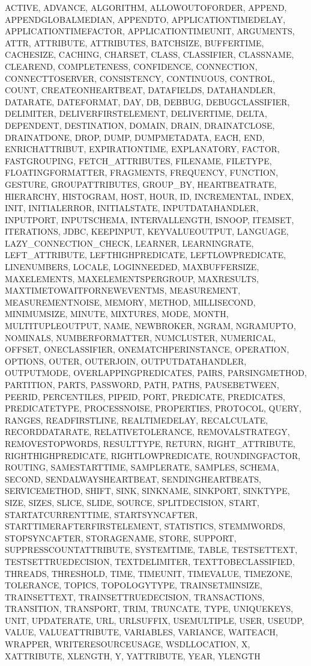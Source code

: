 {{ACTIVE, ADVANCE, ALGORITHM, ALLOWOUTOFORDER, APPEND, APPENDGLOBALMEDIAN, APPENDTO, APPLICATIONTIMEDELAY, APPLICATIONTIMEFACTOR, APPLICATIONTIMEUNIT, ARGUMENTS, ATTR, ATTRIBUTE, ATTRIBUTES, BATCHSIZE, BUFFERTIME, CACHESIZE, CACHING, CHARSET, CLASS, CLASSIFIER, CLASSNAME, CLEAREND, COMPLETENESS, CONFIDENCE, CONNECTION, CONNECTTOSERVER, CONSISTENCY, CONTINUOUS, CONTROL, COUNT, CREATEONHEARTBEAT, DATAFIELDS, DATAHANDLER, DATARATE, DATEFORMAT, DAY, DB, DEBBUG, DEBUGCLASSIFIER, DELIMITER, DELIVERFIRSTELEMENT, DELIVERTIME, DELTA, DEPENDENT, DESTINATION, DOMAIN, DRAIN, DRAINATCLOSE, DRAINATDONE, DROP, DUMP, DUMPMETADATA, EACH, END, ENRICHATTRIBUT, EXPIRATIONTIME, EXPLANATORY, FACTOR, FASTGROUPING, FETCH_ATTRIBUTES, FILENAME, FILETYPE, FLOATINGFORMATTER, FRAGMENTS, FREQUENCY, FUNCTION, GESTURE, GROUPATTRIBUTES, GROUP_BY, HEARTBEATRATE, HIERARCHY, HISTOGRAM, HOST, HOUR, ID, INCREMENTAL, INDEX, INIT, INITIALERROR, INITIALSTATE, INPUTDATAHANDLER, INPUTPORT, INPUTSCHEMA, INTERVALLENGTH, ISNOOP, ITEMSET, ITERATIONS, JDBC, KEEPINPUT, KEYVALUEOUTPUT, LANGUAGE, LAZY_CONNECTION_CHECK, LEARNER, LEARNINGRATE, LEFT_ATTRIBUTE, LEFTHIGHPREDICATE, LEFTLOWPREDICATE, LINENUMBERS, LOCALE, LOGINNEEDED, MAXBUFFERSIZE, MAXELEMENTS, MAXELEMENTSPERGROUP, MAXRESULTS, MAXTIMETOWAITFORNEWEVENTMS, MEASUREMENT, MEASUREMENTNOISE, MEMORY, METHOD, MILLISECOND, MINIMUMSIZE, MINUTE, MIXTURES, MODE, MONTH, MULTITUPLEOUTPUT, NAME, NEWBROKER, NGRAM, NGRAMUPTO, NOMINALS, NUMBERFORMATTER, NUMCLUSTER, NUMERICAL, OFFSET, ONECLASSIFIER, ONEMATCHPERINSTANCE, OPERATION, OPTIONS, OUTER, OUTERJOIN, OUTPUTDATAHANDLER, OUTPUTMODE, OVERLAPPINGPREDICATES, PAIRS, PARSINGMETHOD, PARTITION, PARTS, PASSWORD, PATH, PATHS, PAUSEBETWEEN, PEERID, PERCENTILES, PIPEID, PORT, PREDICATE, PREDICATES, PREDICATETYPE, PROCESSNOISE, PROPERTIES, PROTOCOL, QUERY, RANGES, READFIRSTLINE, REALTIMEDELAY, RECALCULATE, RECORDDATARATE, RELATIVETOLERANCE, REMOVALSTRATEGY, REMOVESTOPWORDS, RESULTTYPE, RETURN, RIGHT_ATTRIBUTE, RIGHTHIGHPREDICATE, RIGHTLOWPREDICATE, ROUNDINGFACTOR, ROUTING, SAMESTARTTIME, SAMPLERATE, SAMPLES, SCHEMA, SECOND, SENDALWAYSHEARTBEAT, SENDINGHEARTBEATS, SERVICEMETHOD, SHIFT, SINK, SINKNAME, SINKPORT, SINKTYPE, SIZE, SIZES, SLICE, SLIDE, SOURCE, SPLITDECISION, START, STARTATCURRENTTIME, STARTSYNCAFTER, STARTTIMERAFTERFIRSTELEMENT, STATISTICS, STEMMWORDS, STOPSYNCAFTER, STORAGENAME, STORE, SUPPORT, SUPPRESSCOUNTATTRIBUTE, SYSTEMTIME, TABLE, TESTSETTEXT, TESTSETTRUEDECISION, TEXTDELIMITER, TEXTTOBECLASSIFIED, THREADS, THRESHOLD, TIME, TIMEUNIT, TIMEVALUE, TIMEZONE, TOLERANCE, TOPICS, TOPOLOGYTYPE, TRAINSETMINSIZE, TRAINSETTEXT, TRAINSETTRUEDECISION, TRANSACTIONS, TRANSITION, TRANSPORT, TRIM, TRUNCATE, TYPE, UNIQUEKEYS, UNIT, UPDATERATE, URL, URLSUFFIX, USEMULTIPLE, USER, USEUDP, VALUE, VALUEATTRIBUTE, VARIABLES, VARIANCE, WAITEACH, WRAPPER, WRITERESOURCEUSAGE, WSDLLOCATION, X, XATTRIBUTE, XLENGTH, Y, YATTRIBUTE, YEAR, YLENGTH%
}}
